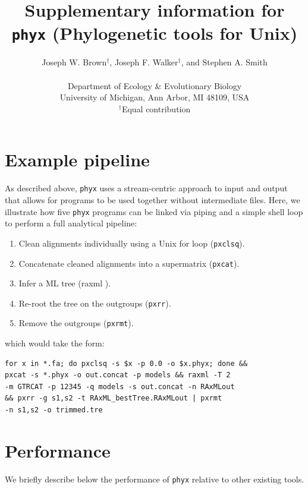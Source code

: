 \documentclass{article}
\begin{document}
\title{Supplementary information for \texttt{phyx} (Phylogenetic tools for Unix)}

\author{Joseph W. Brown$^{\dagger}$, Joseph F. Walker$^{\dagger}$, and Stephen A. Smith\\\\
\normalsize{Department of Ecology \& Evolutionary Biology}\\
\normalsize{University of Michigan, Ann Arbor, MI 48109, USA}\\
\normalsize{$^{\dagger}$Equal contribution}}
\date{} %
\maketitle

\section{Example pipeline}
As described above, \texttt{phyx} uses a stream-centric approach to input and output that allows for programs to be used together without intermediate files. Here, we illustrate how five \texttt{phyx} programs can be linked via piping
and a simple shell loop to perform a full analytical pipeline:
\begin{enumerate}
\item Clean alignments individually using a Unix for loop (\texttt{pxclsq}).
\item Concatenate cleaned alignments into a supermatrix (\texttt{pxcat}).
\item Infer a ML tree (raxml \citep{Stamatakis2014}).
\item Re-root the tree on the outgroups (\texttt{pxrr}).
\item Remove the outgroups (\texttt{pxrmt}).
\end{enumerate}
which would take the form:

\begin{verbatim}
for x in *.fa; do pxclsq -s $x -p 0.0 -o $x.phyx; done &&
pxcat -s *.phyx -o out.concat -p models && raxml -T 2
-m GTRCAT -p 12345 -q models -s out.concat -n RAxMLout
&& pxrr -g s1,s2 -t RAxML_bestTree.RAxMLout | pxrmt
-n s1,s2 -o trimmed.tre
\end{verbatim}

\section{Performance}
We briefly describe below the performance of \texttt{phyx} relative to other
existing tools.
\end{document}
